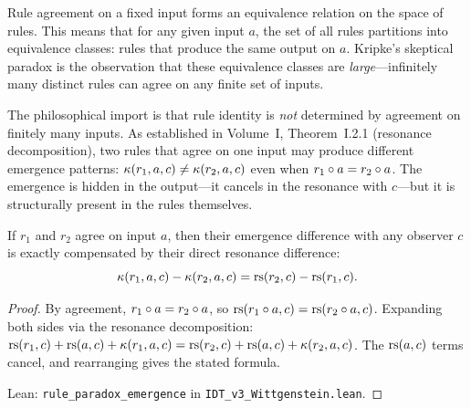\begin{interpretation}
Rule agreement on a fixed input forms an equivalence relation on the space of
rules. This means that for any given input $a$, the set of all rules partitions
into equivalence classes: rules that produce the same output on $a$. Kripke's
skeptical paradox is the observation that these equivalence classes are
\emph{large}---infinitely many distinct rules can agree on any finite set of
inputs.

The philosophical import is that rule identity is \emph{not} determined by
agreement on finitely many inputs. As established in Volume~I, Theorem~I.2.1
(resonance decomposition), two rules that agree on one input may produce
different emergence patterns: $\kappa(r_1, a, c) \neq \kappa(r_2, a, c)$
even when $r_1 \circ a = r_2 \circ a$. The emergence is hidden in the
output---it cancels in the resonance with $c$---but it is structurally present
in the rules themselves.
\end{interpretation}

\begin{theorem}
\label{thm:rule-paradox-emergence}
If $r_1$ and $r_2$ agree on input $a$, then their emergence difference with
any observer $c$ is exactly compensated by their direct resonance difference:
\[
\kappa(r_1, a, c) - \kappa(r_2, a, c) = \mathrm{rs}(r_2, c) - \mathrm{rs}(r_1, c).
\]
\end{theorem}

\begin{proof}
By agreement, $r_1 \circ a = r_2 \circ a$, so
$\mathrm{rs}(r_1 \circ a, c) = \mathrm{rs}(r_2 \circ a, c)$. Expanding both sides
via the resonance decomposition: $\mathrm{rs}(r_1, c) + \mathrm{rs}(a, c) + \kappa(r_1, a, c)
= \mathrm{rs}(r_2, c) + \mathrm{rs}(a, c) + \kappa(r_2, a, c)$. The $\mathrm{rs}(a, c)$ terms
cancel, and rearranging gives the stated formula.

Lean: \texttt{rule\_paradox\_emergence} in \texttt{IDT\_v3\_Wittgenstein.lean}.
\end{proof}

